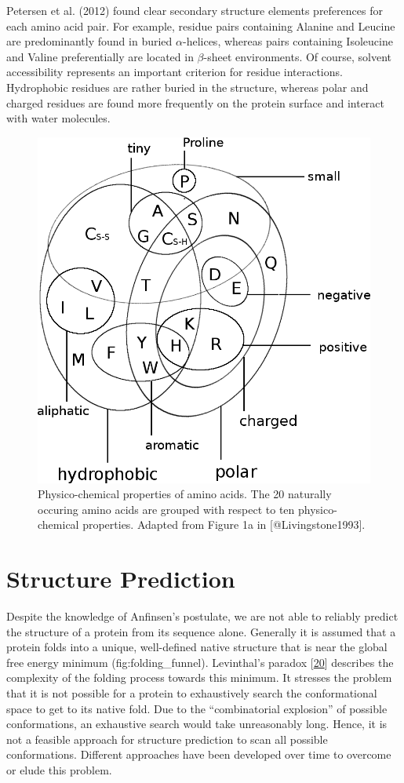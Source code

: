 \documentclass[12pt,a4paper,twoside]{book}
\theoremstyle{definition}
\theoremstyle{definition}
\theoremstyle{remark}
\begin{document}
Petersen et al. (2012) found clear secondary structure elements
preferences for each amino acid pair. For example, residue pairs
containing Alanine and Leucine are predominantly found in buried
\(\alpha\)-helices, whereas pairs containing Isoleucine and Valine
preferentially are located in \(\beta\)-sheet environments. Of course,
solvent accessibility represents an important criterion for residue
interactions. Hydrophobic residues are rather buried in the structure,
whereas polar and charged residues are found more frequently on the
protein surface and interact with water molecules.

\begin{figure}
\includegraphics[width=0.5\linewidth]{img/amino_acid_physico_chemical_properties_venn_diagramm} \caption{Physico-chemical properties of amino acids. The 20 naturally occuring amino acids are grouped with respect to ten physico-chemical properties. Adapted from Figure 1a in [@Livingstone1993].}\label{fig:amino-acid-physico-chemical-properties}
\end{figure}

\section{Structure Prediction}\label{structure-prediction}

Despite the knowledge of Anfinsen's postulate, we are not able to
reliably predict the structure of a protein from its sequence alone.
Generally it is assumed that a protein folds into a unique, well-defined
native structure that is near the global free energy minimum
(fig:folding\_funnel). Levinthal's paradox
{[}\protect\hyperlink{ref-Levinthal1969}{20}{]} describes the complexity
of the folding process towards this minimum. It stresses the problem
that it is not possible for a protein to exhaustively search the
conformational space to get to its native fold. Due to the
``combinatorial explosion'' of possible conformations, an exhaustive
search would take unreasonably long. Hence, it is not a feasible
approach for structure prediction to scan all possible conformations.
Different approaches have been developed over time to overcome or elude
this problem.
\end{document}
